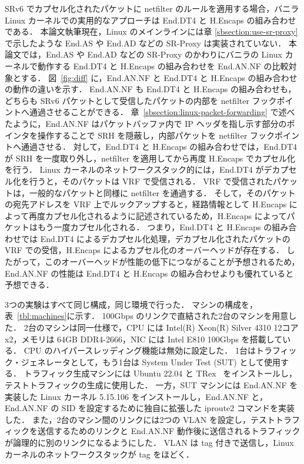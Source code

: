 SRv6 でカプセル化されたパケットに netfilter のルールを適用する場合，バニラ Linux カーネルでの実用的なアプローチは End.DT4 と H.Encaps の組み合わせである．
本論文執筆現在，Linux のメインラインには章 \ref{sbsection:use-sr-proxy} で示したような End.AS や End.AD などの SR-Proxy は実装されていない．
本論文では，End.AS や End.AD などの SR-Proxy のかわりにバニラの Linux カーネルで動作する End.DT4 と H.Encaps の組み合わせを End.AN.NF の比較対象とする．
図~\ref*{fig:diff} に，End.AN.NF と End.DT4 と H.Encaps の組み合わせの動作の違いを示す．
End.AN.NF も End.DT4 と H.Encaps の組み合わせも，どちらも SRv6 パケットとして受信したパケットの内部を netfilter フックポイントへ通過させることができる．
章~\ref{sbsection:linux-packet-forwarding} で述べたように，End.AN.NF はパケットバッファ内で IP ヘッダを指し示す部分のポインタを操作することで SRH を隠蔽し，内部パケットを netfilter フックポイントへ通過させる．
対して，End.DT4 と H.Encaps の組み合わせでは，End.DT4 が SRH を一度取り外し，netfilter を適用してから再度 H.Encaps でカプセル化を行う．
Linux カーネルのネットワークスタック的には，End.DT4 がデカプセル化を行うと，そのパケットは VRF で受信される．
VRF で受信されたパケットは，一般的なパケットと同様に netfilter を通過する．
そして，そのパケットの宛先アドレスを VRF 上でルックアップすると，経路情報として H.Encaps によって再度カプセル化されるように記述されているため，H.Encaps によってパケットはもう一度カプセル化される．
つまり，End.DT4 と H.Encaps の組み合わせでは End.DT4 によるデカプセル化処理，デカプセル化されたパケットの VRF での受信，H.Encaps によるカプセル化のオーバーヘッドが存在する．
したがって，このオーバーヘッドが性能の低下につながることが予想されるため，End.AN.NF の性能は End.DT4 と H.Encaps の組み合わせよりも優れていると予想できる．

3つの実験はすべて同じ構成，同じ環境で行った．
マシンの構成を，表~\ref*{tbl:machines}に示す．
100Gbps のリンクで直結された2台のマシンを用意した．
2台のマシンは同一仕様で，CPU には Intel(R) Xeon(R) Silver 4310 12コア x2，メモリは 64GB DDR4-2666，NIC には Intel E810 100Gbps を搭載している．
CPU のハイパースレッディング機能は無効に設定した．
1台はトラフィック・ジェネレータとして，もう1台は System Under Test (SUT) として使用する．
トラフィック生成マシンには Ubuntu 22.04 と TRex~\cite{trex} をインストールし，テストトラフィックの生成に使用した．
一方，SUT マシンには End.AN.NF を実装した Linux カーネル 5.15.106 をインストールし，End.AN.NF と，End.AN.NF の SID を設定するために独自に拡張した iproute2 コマンドを実装した．
また，2台のマシン間のリンクには2つの VLAN を設定し，テストトラフィックを送信するためのリンクと End.AN.NF 動作後に送信されるトラフィックが論理的に別のリンクになるようにした．
VLAN は tag 付きで送信し，Linux カーネルのネットワークスタックが tag をほどく．

